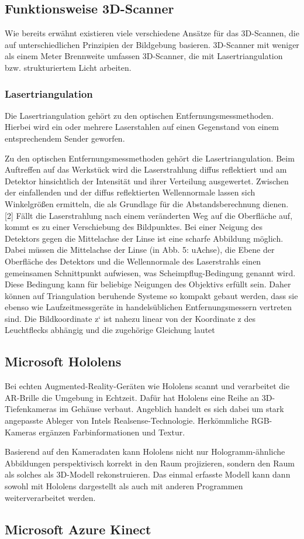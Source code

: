 \subsection{Funktionsweise 3D-Scanner}
Wie bereits erwähnt existieren viele verschiedene Ansätze für das 3D-Scannen, die auf unterschiedlichen Prinzipien der Bildgebung basieren. 3D-Scanner mit weniger als einem Meter Brennweite umfassen 3D-Scanner, die mit Lasertriangulation bzw. strukturiertem Licht arbeiten.

\subsubsection{Lasertriangulation}
Die Lasertriangulation gehört zu den optischen Entfernungsmessmethoden. Hierbei wird ein oder mehrere Laserstahlen auf einen Gegenstand von einem entsprechendem Sender geworfen.

Zu den optischen Entfernungsmessmethoden gehört die Lasertriangulation. Beim Auftreffen auf das Werkstück wird die Laserstrahlung diffus reflektiert und am Detektor hinsichtlich der Intensität und ihrer Verteilung ausgewertet. Zwischen der einfallenden und der diffus reflektierten Wellennormale lassen sich Winkelgrößen ermitteln, die als Grundlage für die Abstandsberechnung dienen. [2] Fällt die Laserstrahlung nach einem veränderten Weg auf die Oberfläche auf, kommt es zu einer Verschiebung des Bildpunktes. Bei einer Neigung des Detektors gegen die Mittelachse der Linse ist eine scharfe Abbildung möglich. Dabei müssen die Mittelachse der Linse (in Abb. 5: uAchse), die Ebene der Oberfläche des Detektors und die Wellennormale des Laserstrahls einen gemeinsamen Schnittpunkt aufwiesen, was Scheimpflug-Bedingung genannt wird. Diese Bedingung kann für beliebige Neigungen des Objektivs erfüllt sein. Daher können auf Triangulation beruhende Systeme so kompakt gebaut werden, dass sie ebenso wie Laufzeitmessgeräte in handelsüblichen Entfernungsmessern vertreten sind. Die Bildkoordinate z‘ ist nahezu linear von der Koordinate z des Leuchtflecks abhängig und die zugehörige Gleichung lautet


\subsection{Microsoft Hololens}
Bei echten Augmented-Reality-Geräten wie Hololens scannt und verarbeitet die AR-Brille die Umgebung in Echtzeit. Dafür hat Hololens eine Reihe an 3D-Tiefenkameras im Gehäuse verbaut. Angeblich handelt es sich dabei um stark angepasste Ableger von Intels Realsense-Technologie. Herkömmliche RGB-Kameras ergänzen Farbinformationen und Textur.

Basierend auf den Kameradaten kann Hololens nicht nur Hologramm-ähnliche Abbildungen perspektivisch korrekt in den Raum projizieren, sondern den Raum als solches als 3D-Modell rekonstruieren. Das einmal erfasste Modell kann dann sowohl mit Hololens dargestellt als auch mit anderen Programmen weiterverarbeitet werden.

\subsection{Microsoft Azure Kinect}